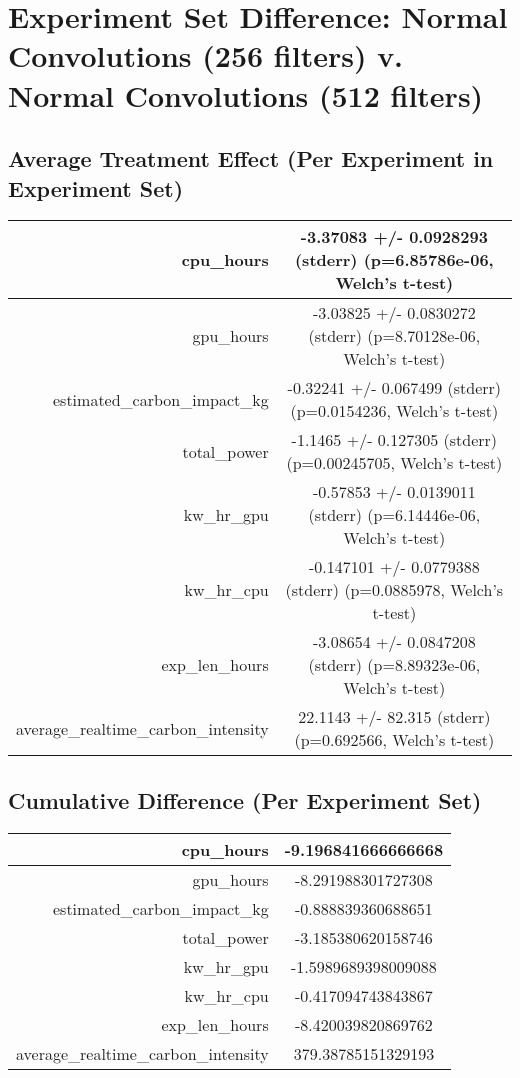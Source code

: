 \documentclass{article}%
\begin{document}
%
\normalsize%
\section{Experiment Set Difference: Normal Convolutions (256 filters) v. Normal Convolutions (512 filters)}%
\label{sec:Experiment Set Difference Normal Convolutions (256 filters) v. Normal Convolutions (512 filters)}%
\subsection{Average Treatment Effect (Per Experiment in Experiment Set)}%
\label{subsec:Average Treatment Effect (Per Experiment in Experiment Set)}%
\begin{tabular}{|r|c|}%
\hline%
cpu\_hours&{-}3.37083 +/{-} 0.0928293 (stderr) (p=6.85786e{-}06, Welch's t{-}test)\\%
\hline%
gpu\_hours&{-}3.03825 +/{-} 0.0830272 (stderr) (p=8.70128e{-}06, Welch's t{-}test)\\%
\hline%
estimated\_carbon\_impact\_kg&{-}0.32241 +/{-} 0.067499 (stderr) (p=0.0154236, Welch's t{-}test)\\%
\hline%
total\_power&{-}1.1465 +/{-} 0.127305 (stderr) (p=0.00245705, Welch's t{-}test)\\%
\hline%
kw\_hr\_gpu&{-}0.57853 +/{-} 0.0139011 (stderr) (p=6.14446e{-}06, Welch's t{-}test)\\%
\hline%
kw\_hr\_cpu&{-}0.147101 +/{-} 0.0779388 (stderr) (p=0.0885978, Welch's t{-}test)\\%
\hline%
exp\_len\_hours&{-}3.08654 +/{-} 0.0847208 (stderr) (p=8.89323e{-}06, Welch's t{-}test)\\%
\hline%
average\_realtime\_carbon\_intensity&22.1143 +/{-} 82.315 (stderr) (p=0.692566, Welch's t{-}test)\\%
\hline%
\end{tabular}

%
\subsection{Cumulative Difference (Per Experiment Set)}%
\label{subsec:Cumulative Difference (Per Experiment Set)}%
\begin{tabular}{|r|c|}%
\hline%
cpu\_hours&{-}9.196841666666668\\%
\hline%
gpu\_hours&{-}8.291988301727308\\%
\hline%
estimated\_carbon\_impact\_kg&{-}0.888839360688651\\%
\hline%
total\_power&{-}3.185380620158746\\%
\hline%
kw\_hr\_gpu&{-}1.5989689398009088\\%
\hline%
kw\_hr\_cpu&{-}0.417094743843867\\%
\hline%
exp\_len\_hours&{-}8.420039820869762\\%
\hline%
average\_realtime\_carbon\_intensity&379.38785151329193\\%
\hline%
\end{tabular}

%
\end{document}
